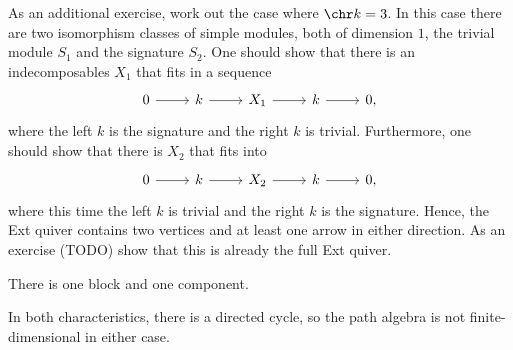 \begin{enumerate}
		As an additional exercise, work out the case where $\chr k = 3$. In this
		case there are two isomorphism classes of simple modules, both of dimension
		$1$, the trivial module $S_1$ and the signature $S_2$. One should show that there
		is an indecomposables $X_1$ that fits in a sequence
		\[\begin{tikzcd}
			0\ar[r] & k\ar[r] & X_1\ar[r] & k\ar[r] & 0,
		\end{tikzcd}\]
		where the left $k$ is the signature and the right $k$ is trivial. Furthermore,
		one should show that there is $X_2$ that fits into
		\[\begin{tikzcd}
			0\ar[r] & k\ar[r] & X_2\ar[r] & k\ar[r] & 0,
		\end{tikzcd}\]
		where this time the left $k$ is trivial and the right $k$ is the signature.
		Hence, the Ext quiver contains two vertices and at least one arrow in either
		direction.
		As an exercise (TODO) show that this is already the full Ext quiver.

		There is one block and one component.

		In both characteristics, there is a directed cycle, so the path algebra
		is not finite-dimensional in either case.
\end{enumerate}

